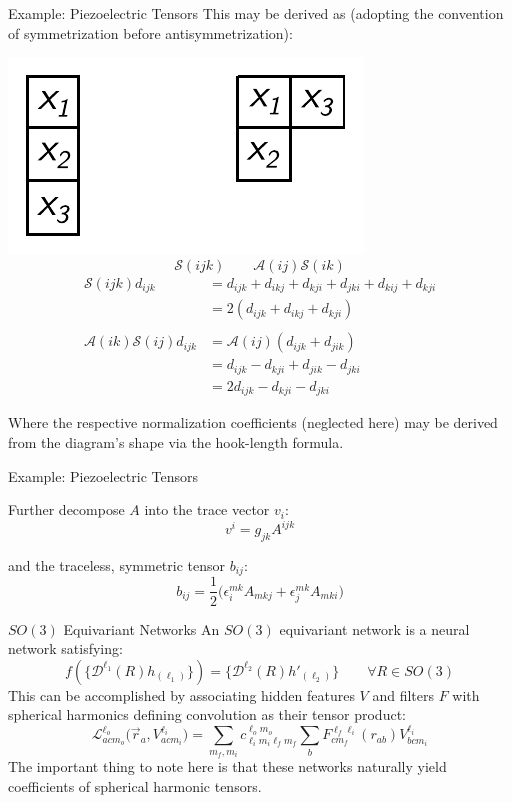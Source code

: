 \documentclass[11pt]{beamer}
\begin{document}
\begin{frame}{Example: Piezoelectric Tensors}
This may be derived as (adopting the convention of symmetrization before antisymmetrization):
\begin{center}\small
\includegraphics[scale=0.5]{piezo_young.pdf}
$$
\mathcal{S}(ijk)\quad\quad \mathcal{A}(ij)\mathcal{S}(ik)
$$
\begin{align*}
\mathcal{S}(ijk)d_{ijk}& =d_{ijk}+d_{ikj}+d_{kji}+d_{jki}+d_{kij}+d_{kji}\\
&=2( d_{ijk}+d_{ikj}+d_{kji})\\
\\
\mathcal{A}(ik)\mathcal{S}(ij)d_{ijk}& =\mathcal{A}(ij)(d_{ijk}+d_{jik})\\
&=d_{ijk}-d_{kji}+d_{jik}-d_{jki}\\
&= 2d_{ijk}-d_{kji}-d_{jki}
\end{align*}
\end{center}
Where the respective normalization coefficients (neglected here) may be derived from the diagram's shape via the hook-length formula.
\end{frame}
\begin{frame}{Example: Piezoelectric Tensors}
\begin{center}
Further decompose $A$ into the trace vector $v_i$:
$$
v^i =g_{jk}A^{ijk}
$$

and the traceless, symmetric tensor $b_{ij}$:
$$
b_{ij}=\frac{1}{2}\big(\epsilon_{i}^{mk}A_{mkj}+\epsilon_{j}^{mk}A_{mki}\big)
$$
\end{center}
\end{frame}
\begin{frame}{$SO(3)$ Equivariant Networks}
An $SO(3)$ equivariant network is a neural network  satisfying:
$$
f(\lbrace \mathcal{D}^{\ell_1}(R)h_{(\ell_1)}\rbrace) = \lbrace\mathcal{D}^{\ell_2}(R) h'_{(\ell_2)}\rbrace \quad\quad \forall R\in SO(3)
$$
This can be accomplished by associating hidden features $V$  and filters $F$ with spherical harmonics defining convolution as their tensor product:
$$
\mathcal{L}^{\ell_o}_{acm_o}\big(\vec{r}_a,V_{acm_i}^{\ell_i}\big) = \sum_{m_f,m_i}c_{\ell_im_i\ell_fm_f}^{\ell_o m_o}\sum_{b}F^{\ell_f\ell_i}_{cm_f}(r_{ab})V_{bcm_i}^{\ell_i}
$$
The important thing to note here is that these networks naturally yield coefficients of spherical harmonic tensors.
\end{frame}
\end{document}
